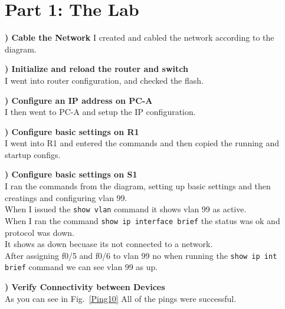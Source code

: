 \documentclass{report}
\title{\classinfo}
\author{\semester}
\date{\today}
\newcommand{\mysection}[1]{\section*{#1}}
\newcommand{\mysubsection}[2]{\textbf{\romannumeral #1) #2}}
\begin{document}
\maketitle

\mysection{\textbf{Part 1: The Lab}}

\mysubsection{1}{Cable the Network}
I created and cabled the network according to the diagram.


\noindent\mysubsection{2}{Initialize and reload the router and switch}
\\I went into router configuration, and checked the flash.


\noindent\mysubsection{3}{Configure an IP address on PC-A}
\\I then went to PC-A and setup the IP configuration.

\noindent\mysubsection{4}{Configure basic settings on R1}
\\I went into R1 and entered the commands and then copied the running and
startup configs.


\noindent\mysubsection{5}{Configure basic settings on S1}
\\I ran the commands from the diagram, setting up basic settings and then
creatings and configuring vlan 99. 
\\When I issued the {\scriptsize{\verb$show vlan$}\normalsize} command 
it shows vlan 99 as active.
\\ When I ran the command {\scriptsize{\verb$show ip interface brief$}\normalsize} 
the status was ok and protocol was down. 
\\It shows as down becuase its not connected to a network.
\\After assigning f0/5 and f0/6 to vlan 99 no when running
the {\scriptsize{\verb$show ip int brief$}\normalsize} command
we can see vlan 99 as up.



\noindent\mysubsection{6}{Verify Connectivity between Devices}
\\As you can see in Fig.~\ref{Ping10} All of the pings were successful.
\end{document}
